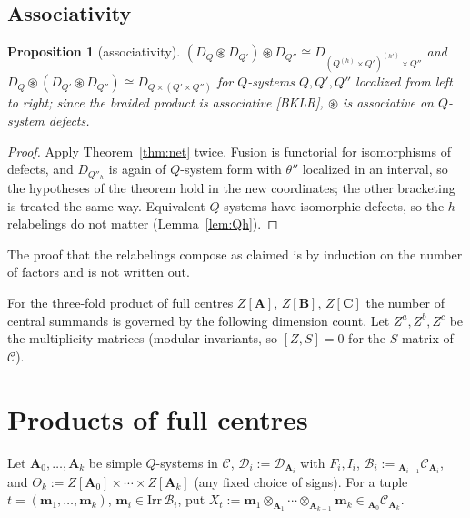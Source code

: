 \documentclass[11pt]{article}
\newtheorem{proposition}[theorem]{Proposition}
\theoremstyle{definition}
\theoremstyle{remark}
\newcommand{\bfB}{\mathbf B}
\newcommand{\bfA}{\mathbf A}
\newcommand{\bfC}{\mathbf C}
\newcommand{\cfus}{\circledast}
\begin{document}
\subsection{Associativity}
\begin{proposition}[associativity]\label{prop:assoc}
$(D_Q\cfus D_{Q'})\cfus D_{Q''}\cong D_{(Q^{(h)}\times Q')^{(h')}\times Q''}$ and $D_Q\cfus(D_{Q'}\cfus D_{Q''})\cong D_{Q\times(Q'\times Q'')}$ for $Q$-systems $Q,Q',Q''$ localized from left to right; since the braided product is associative [BKLR], $\cfus$ is associative on $Q$-system defects.
\end{proposition}
\begin{proof}
Apply Theorem~\ref{thm:net} twice. Fusion is functorial for isomorphisms of defects, and $D_{Q''_h}$ is again of $Q$-system form with $\theta''$ localized in an interval, so the hypotheses of the theorem hold in the new coordinates; the other bracketing is treated the same way. Equivalent $Q$-systems have isomorphic defects, so the $h$-relabelings do not matter (Lemma~\ref{lem:Qh}).
\end{proof}
The proof that the relabelings compose as claimed is by induction on the number of factors and is not written out.

For the three-fold product of full centres $Z[\bfA]$, $Z[\bfB]$, $Z[\bfC]$ the number of central summands is governed by the following dimension count. Let $Z^a,Z^b,Z^c$ be the multiplicity matrices (modular invariants, so $[Z,S]=0$ for the $S$-matrix of $\mathcal C$).

\section{Products of full centres}\label{sec:products}
Let $\mathbf A_0,\dots,\mathbf A_k$ be simple $Q$-systems in $\mathcal C$, $\mathcal D_i:=\mathcal D_{\mathbf A_i}$ with $F_i,I_i$, $\mathcal B_i:={}_{\mathbf A_{i-1}}\mathcal C_{\mathbf A_i}$, and $\Theta_k:=Z[\mathbf A_0]\times\cdots\times Z[\mathbf A_k]$ (any fixed choice of signs). For a tuple $t=(\mathbf m_1,\dots,\mathbf m_k)$, $\mathbf m_i\in\mathrm{Irr}\,\mathcal B_i$, put $X_t:=\mathbf m_1\otimes_{\mathbf A_1}\cdots\otimes_{\mathbf A_{k-1}}\mathbf m_k\in{}_{\mathbf A_0}\mathcal C_{\mathbf A_k}$.
\end{document}
